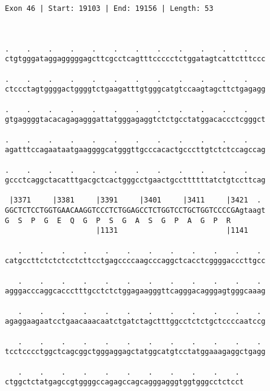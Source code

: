 \documentclass{article}
\begin{document}
\begin{Verbatim}
Exon 46 | Start: 19103 | End: 19156 | Length: 53



.    .    .    .    .    .    .    .    .    .    .    .    
ctgtgggataggagggggagcttcgcctcagtttccccctctggatagtcattctttccc
                                                            
.    .    .    .    .    .    .    .    .    .    .    .    
ctccctagtggggactggggtctgaagatttgtgggcatgtccaagtagcttctgagagg
                                                            
.    .    .    .    .    .    .    .    .    .    .    .    
gtgaggggtacacagagagggattatgggagaggtctctgcctatggacaccctcgggct
                                                            
.    .    .    .    .    .    .    .    .    .    .    .    
agatttccagaataatgaaggggcatgggttgcccacactgcccttgtctctccagccag
                                                            
.    .    .    .    .    .    .    .    .    .    .    .    
gccctcaggctacatttgacgctcactgggcctgaactgccttttttatctgtccttcag
                                                            
 |3371     |3381     |3391     |3401     |3411     |3421  . 
GGCTCTCCTGGTGAACAAGGTCCCTCTGGAGCCTCTGGTCCTGCTGGTCCCCGAgtaagt
G  S  P  G  E  Q  G  P  S  G  A  S  G  P  A  G  P  R        
                     |1131                         |1141    
  
   .    .    .    .    .    .    .    .    .    .    .    . 
catgccttctctctcctcttcctgagccccaagcccaggctcacctcggggacccttgcc
                                                            
   .    .    .    .    .    .    .    .    .    .    .    . 
agggacccaggcaccctttgcctctctggagaagggttcagggacagggagtgggcaaag
                                                            
   .    .    .    .    .    .    .    .    .    .    .    . 
agaggaagaatcctgaacaaacaatctgatctagctttggcctctctgctccccaatccg
                                                            
   .    .    .    .    .    .    .    .    .    .    .    . 
tcctcccctggctcagcggctgggaggagctatggcatgtcctatggaaagaggctgagg
                                                            
   .    .    .    .    .    .    .    .    .    .    . 
ctggctctatgagccgtggggccagagccagcagggagggtggtgggcctctcct
                                                       

\end{Verbatim}
\end{document}
